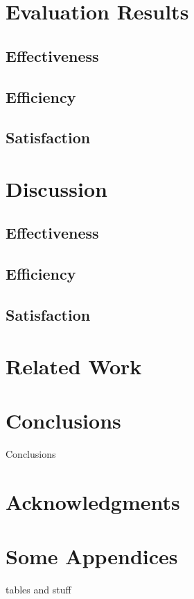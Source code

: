 \documentclass{sig-alternate-05-2015}
\begin{document}
\section{Evaluation Results}
\subsection{Effectiveness}
\subsection{Efficiency}
\subsection{Satisfaction}
\section{Discussion}
\subsection{Effectiveness}
\subsection{Efficiency}
\subsection{Satisfaction}
\section{Related Work}
\section{Conclusions}
Conclusions

\section{Acknowledgments}

%

%
%
\appendix
\section{Some Appendices}
tables and stuff
\end{document}
